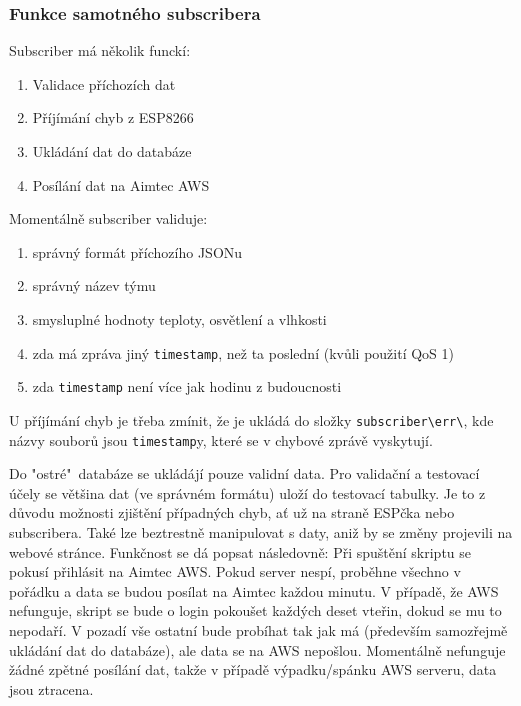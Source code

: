 \subsubsection{Funkce samotného subscribera}
Subscriber má několik funckí:
\begin{enumerate}
    \item Validace příchozích dat
    \item Příjímání chyb z ESP8266
    \item Ukládání dat do databáze
    \item Posílání dat na Aimtec AWS
\end{enumerate}
Momentálně subscriber validuje:
\begin{enumerate}
    \item správný formát příchozího JSONu
    \item správný název týmu
    \item smysluplné hodnoty teploty, osvětlení a vlhkosti
    \item zda má zpráva jiný \verb|timestamp|, než ta poslední (kvůli použití QoS 1)
    \item zda \verb|timestamp| není více jak hodinu z budoucnosti
\end{enumerate}
U příjímání chyb je třeba zmínit, že je ukládá do složky \verb|subscriber\err\|, kde názvy souborů jsou \verb|timestamp|y, které se v chybové zprávě vyskytují.

Do "ostré"\ databáze se ukládájí pouze validní data. Pro validační a testovací účely se většina dat (ve správném formátu) uloží do testovací tabulky.
Je to z důvodu možnosti zjištění případných chyb, ať už na straně ESPčka nebo subscribera. Také lze beztrestně manipulovat s daty, aniž by se změny projevili na webové stránce.
Funkčnost se dá popsat následovně:
Při spuštění skriptu se pokusí přihlásit na Aimtec AWS. Pokud server nespí, proběhne všechno v pořádku a data se budou posílat na Aimtec každou minutu.
V případě, že AWS nefunguje, skript se bude o login pokoušet každých deset vteřin, dokud se mu to nepodaří. V pozadí vše ostatní bude probíhat tak jak má (především samozřejmě ukládání dat do databáze), ale data se na AWS nepošlou. 
Momentálně nefunguje žádné zpětné posílání dat, takže v případě výpadku/spánku AWS serveru, data jsou ztracena.  